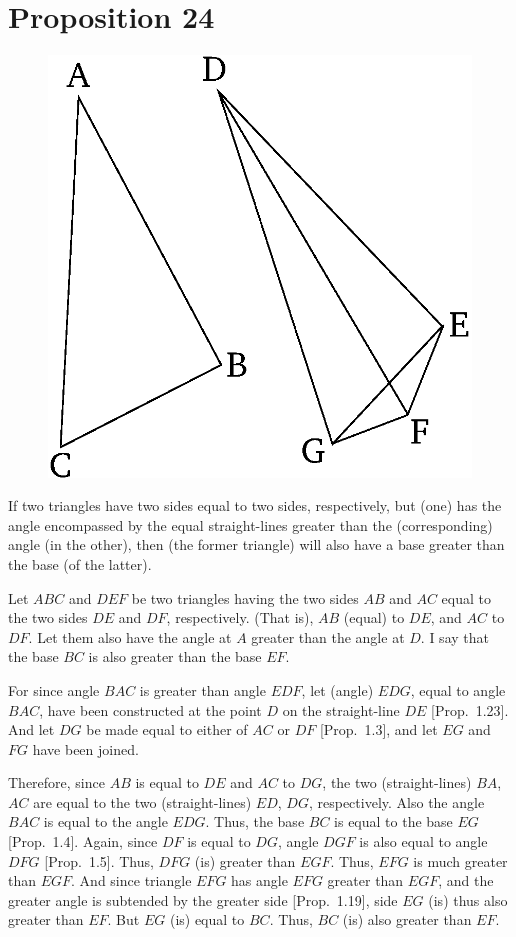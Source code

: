 \chapter*{Proposition 24}
\label{prop:24}

\begin{figure}[ht]
    \begin{center}
    \includegraphics[width=0.5\linewidth]{figures/fig24e.eps}
    \label{fig:prop_24}
    \end{center}
\end{figure}

If two triangles have two sides equal to two sides, respectively,
but (one) has the angle encompassed by the equal straight-lines greater than the (corresponding)
angle (in the other), then (the former triangle) will also have a base greater than the base (of the latter).

Let  $ABC$ and $DEF$ be two triangles having the two sides $AB$ and $AC$
equal to the two sides $DE$ and $DF$, respectively. (That is), $AB$ (equal) to $DE$, and
$AC$ to $DF$.  Let them also have the angle at $A$ greater than the angle at $D$.
I say that the base $BC$ is also greater than the base $EF$.

For since angle $BAC$ is greater than angle $EDF$, let (angle) $EDG$, equal to
angle $BAC$,  have been constructed at  the point $D$ on the straight-line $DE$ [Prop.~1.23]. And let $DG$ be made equal to either of $AC$ or $DF$ [Prop.~1.3], and let $EG$ and $FG$ have been joined.

Therefore, since $AB$ is equal to $DE$ and $AC$ to $DG$, the two (straight-lines)
$BA$, $AC$ are equal to the two (straight-lines) $ED$, $DG$, respectively.
Also the angle $BAC$ is equal to the angle $EDG$. Thus, the base $BC$ is equal
to the base $EG$ [Prop.~1.4]. Again, since $DF$ is equal to $DG$, angle $DGF$
is also equal to angle $DFG$ [Prop.~1.5]. Thus, $DFG$ (is) greater than $EGF$.
Thus, $EFG$ is much greater than $EGF$. And since triangle $EFG$ has angle $EFG$
greater than $EGF$, and the greater angle is subtended by the greater side [Prop.~1.19], side $EG$ (is) thus also greater than $EF$. But $EG$ (is) equal to
$BC$. Thus, $BC$ (is) also greater than $EF$.

